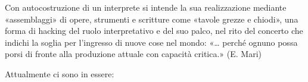 \documentclass{gs-adonis}
\begin{document}


Con autocostruzione di un interprete si intende la sua realizzazione mediante
«assemblaggi» di opere, strumenti e scritture come «tavole grezze e chiodi»,
una forma di hacking del ruolo interpretativo e del suo palco, nel rito del
concerto che indichi la soglia per l'ingresso di nuove cose nel mondo:
«… perché ognuno possa porsi di fronte alla produzione
attuale con capacità critica.» (E. Mari)


Attualmente ci sono in essere:
\end{document}
